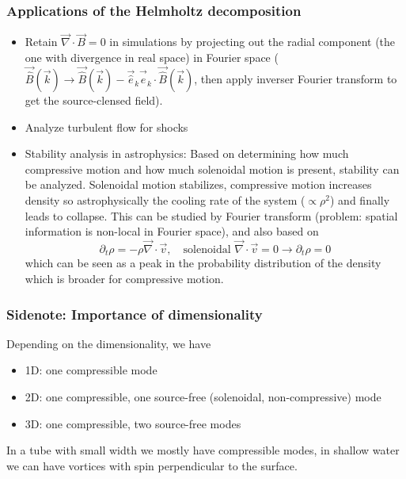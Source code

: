 \subsubsection{Applications of the Helmholtz decomposition}
\begin{itemize}
    \item Retain $\vec{\nabla} \cdot \vec{B} = 0$ in simulations by projecting out the radial component (the one with divergence in real space) in Fourier space ($\vec{\hat{B}}(\vec{k}) \rightarrow \vec{\hat{B}}(\vec{k}) - \vec{\hat{e}}_k \vec{\hat{e}}_k  \cdot \vec{\hat{B}}(\vec{k})$, then apply inverser Fourier transform to get the source-clensed field).
    \item Analyze turbulent flow for shocks
    \item Stability analysis in astrophysics: Based on determining how much compressive motion and how much solenoidal motion is present, stability can be analyzed. Solenoidal motion stabilizes, compressive motion increases density so astrophysically the cooling rate of the system ($\propto \rho^2$) and finally leads to collapse.
    This can be studied by Fourier transform (problem: spatial information is non-local in Fourier space), and also based on
    \begin{equation}
        \partial_t \rho = - \rho \vec{\nabla} \cdot \vec{v}, \quad \text{solenoidal } \vec{\nabla} \cdot \vec{v} = 0 \rightarrow \partial_t \rho = 0
    \end{equation}
    which can be seen as a peak in the probability distribution of the density which is broader for compressive motion.
\end{itemize}

\subsubsection{Sidenote: Importance of dimensionality}
Depending on the dimensionality, we have
\begin{itemize}
    \item 1D: one compressible mode
    \item 2D: one compressible, one source-free (solenoidal, non-compressive) mode
    \item 3D: one compressible, two source-free modes
\end{itemize}

In a tube with small width we mostly have compressible modes, in shallow water we can have vortices with spin perpendicular to the surface.

\pagebreak